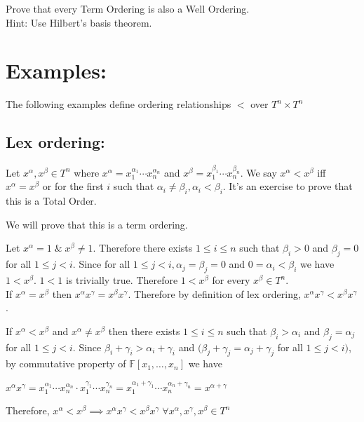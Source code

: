 \begin{exercise}
Prove that every Term Ordering is also a Well Ordering.\\
Hint: Use Hilbert's basis theorem.
\end{exercise}




\section*{Examples:}
The following examples define ordering relationships $<$ over $T^{n}\times T^{n}$
\subsection*{Lex ordering:}
Let $x^{\alpha},x^{\beta} \in T^{n}$ where
$x^{\alpha}=x_{1}^{\alpha_{1}}\cdots x_{n}^{\alpha_{n}}$ and $x^{\beta}=x_{1}^{\beta_{1}}\cdots x_{n}^{\beta_{n}}$. We say 
$x^{\alpha}<x^{\beta}$ iff $x^{\alpha}=x^{\beta}$ or for the first $i$ such that $\alpha_{i}\neq \beta_{i}, \alpha_{i}<\beta_{i}$.
It's an exercise to prove that this is a Total Order. 

We will prove that this is a term ordering.

Let $x^{\alpha}=1\;\&\;x^{\beta}\neq1$. Therefore
there exists $1\leq i\leq n$ such that $\beta_{i}>0$ and $\beta_{j}=0$ for all $1\leq j<i$. Since 
for all $1\leq j<i, \alpha_{j}=\beta_{j}=0$ and
$0=\alpha_{i}<\beta_{i}$ we have $1<x^{\beta}$.
$1<1$ is trivially true. Therefore
$1<x^{\beta}$ for every $x^{\beta}\in T^n$.\\


If $x^{\alpha}=x^{\beta}$ then $x^{\alpha}x^{\gamma}=x^{\beta}x^{\gamma}$. Therefore by definition of lex ordering, $x^{\alpha}x^{\gamma}<x^{\beta}x^{\gamma}$.

If $x^{\alpha}<x^{\beta}$ and $x^{\alpha}\neq x^{\beta}$ then there exists $1\leq i\leq n$ such that $\beta_{i}>\alpha_{i}$ and $\beta_{j}=\alpha_{j}$ for all $1\leq j<i$. Since $\beta_{i}+\gamma_{i}>\alpha_{i}+\gamma_{i}$ and $(\beta_{j}+\gamma_{j}=\alpha_{j}+\gamma_{j}$ for all $1\leq j<i)$, by commutative property of $\mathbb{F}[x_{1},\ldots,x_{n}]$ we have
\begin{center}
$x^{\alpha}x^{\gamma}=x_{1}^{\alpha_{1}}\cdots x_{n}^{\alpha_{n}}\cdot x_{1}^{\gamma_{1}}\cdots x_{n}^{\gamma_{n}}=x_{1}^{\alpha_{1}+\gamma_{1}}\cdots x_{n}^{\alpha_{n}+\gamma_{n}}=x^{\alpha+\gamma}$
\end{center}
Therefore,
$x^{\alpha}<x^{\beta}\implies x^{\alpha}x^{\gamma}<x^{\beta}x^{\gamma}\; \forall x^{\alpha},x^{\gamma},x^{\beta}\in T^{n}$


